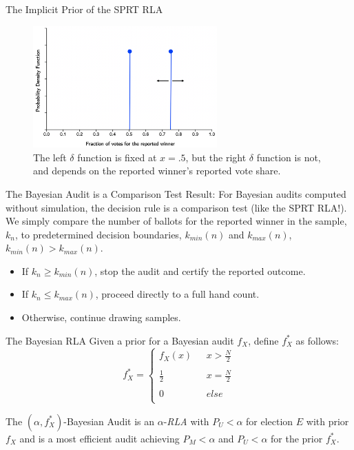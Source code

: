 \documentclass{beamer}
\begin{document}
\begin{frame}{The Implicit Prior of the SPRT RLA}
\begin{figure}
    \centering
    \includegraphics[width=200pt]{SPRT_Prior.png}
    \caption{The left $\delta$ function is fixed at $x = .5$, but the right $\delta$ function is not, and depends on the reported winner's reported vote share.}
    \label{fig:my_label}
\end{figure}
\end{frame}

\begin{frame}{The Bayesian Audit is a Comparison Test}
Result: For Bayesian audits computed without simulation, the decision rule is a comparison test (like the SPRT RLA!).
\vskip 1cm
We simply compare the number of ballots for the reported winner in the sample, $k_n$, to predetermined decision boundaries, $k_{min}(n)$ and $k_{max}(n)$, $k_{min}(n) > k_{max}(n)$.
\begin{itemize}
    \item If $k_n \geq k_{min}(n)$, stop the audit and certify the reported outcome.
    \item If $k_n \leq k_{max}(n)$, proceed directly to a full hand count.
    \item Otherwise, continue drawing samples.
\end{itemize}
\end{frame}

\begin{frame}{The Bayesian RLA}
Given a prior for a Bayesian audit $f_X$, define $f_X^*$ as follows:
\begin{equation}
f_X^* =  \left\{ \begin{array}{ll} f_X(x) & ~~~ x > \frac{N}{2}\\
& \\
\frac{1}{2}& ~~~ x=\frac{N}{2} \\
& \\
0 & ~~~else \\
\end{array}
\right .
\label{eqn:f_X*}
\end{equation}
\begin{theorem}
The $(\alpha, f_X^*)$-Bayesian Audit is an $\alpha$-{\em RLA} with $P_U < \alpha$ for election $E$ with prior $f_X$ and is a most efficient audit achieving $P_M < \alpha$ and $P_U < \alpha$ for the prior $f_X^*$.
\end{theorem} 
\end{frame}
\end{document}
